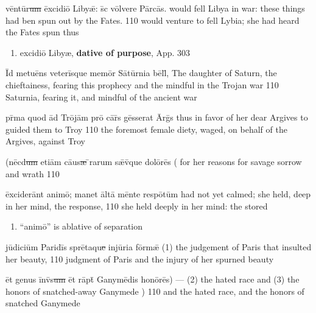  

\latline
{v\=ent\={\macron u}r\sout{um }\=exc\-id\-i\={\macron o} L\-ib\-y\={\ae}: s\={\macron{\i}}c v\=olv\-er\-e P\=arc\={\macron a}s.}
{would fell Libya in war: these things had ben spun out by the Fates.}
{110}
{would venture to fell Lybia; she had heard the Fates spun thus}
{\begin{enumerate}
	\item excidi\={\macron o} Liby{\ae}, \textbf{dative of purpose}, App. 303
\end{enumerate}}

\latline
{\=Id m\-et\-u\={\macron e}ns v\-et\-er\=isqu\-e m\-em\=or S\={\macron a}t\=urn\-i\-a b\=ell\={\macron{\i}},}
{The daughter of Saturn, the chieftainess, fearing this prophecy and the mindful in the Trojan war}
{110}
{Saturnia, fearing it, and mindful of the ancient war}
{}

\latline
{pr\={\macron{\i}}m\-a qu\-od \=ad Tr\=oj\=am pr\={\macron o} c\={\macron a}r\={\macron{\i}}s g\=ess\-er\-at \=Arg\={\macron{\i}}s}
{thus in favor of her dear Argives to guided them to Troy}
{110}
{the foremost female diety, waged, on behalf of the Argives, against Troy}
{}



\latline
{(n\=ecd\sout{um }\-et\-i\=am c\={au}s\sout{{{\ae}} }\={\macron{\i}}r{\macron a}rum s\={{\ae}}v\={\macron{\i}}qu\-e d\-ol\={\macron o}r\={\macron e}s}
{( for her reasons for savage sorrow and wrath }
{110}
{}
{}

\latline
{\=exc\-id\-er\=ant \-an\-im\={\macron o}; m\-an\-et \=alt\={\macron a} m\=ent\-e r\-esp\=ot\=um }
{had not yet calmed; she held, deep in her mind, the response,}
{110}
{she held deeply in her mind: the stored }
{
\begin{enumerate}
	\item ``anim\=o'' is ablative of separation
\end{enumerate}
}

\latline
{j\={\macron u}d\-ic\-i\=um P\-ar\-id\=is spr\={\macron e}t\-aqu\sout{e }\-inj\={\macron u}r\-i\-a f\=orm\={\ae}}
{(1) the judgement of Paris that insulted her beauty, }
{110}
{judgment of Paris and the injury of her spurned beauty}
{}



\latline
{\=et g\-en\-us \=inv\={\macron{\i}}s\sout{um }\=et  r\=apt\={\macron{\i}} G\-an\-ym\={\macron e}d\-is h\-on\={\macron o}r\={\macron e}s) ---}
{(2) the hated race and (3) the honors of snatched-away Ganymede )}
{110}
{and the hated race, and the honors of snatched Ganymede}
{}

